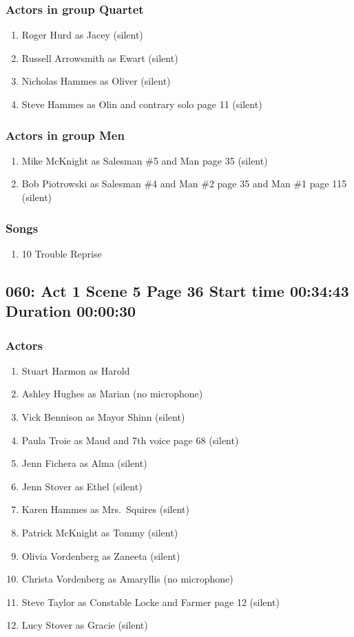 \subsubsection{Actors in group Quartet}
\begin{enumerate}
\item Roger Hurd as Jacey (silent)
\item Russell Arrowsmith as Ewart (silent)
\item Nicholas Hammes as Oliver (silent)
\item Steve Hammes as Olin and contrary solo page 11 (silent)
\end{enumerate}
\subsubsection{Actors in group Men}
\begin{enumerate}
\item Mike McKnight as Salesman \#5 and Man page 35 (silent)
\item Bob Piotrowski as Salesman \#4 and Man \#2 page 35 and Man \#1 page 115 (silent)
\end{enumerate}

\subsubsection{Songs}
\begin{enumerate}
\item 10 Trouble Reprise
\end{enumerate}
\subsection{060: Act 1 Scene 5 Page 36 Start time 00:34:43 Duration 00:00:30}

\subsubsection{Actors}
\begin{enumerate}
\item Stuart Harmon as Harold
\item Ashley Hughes as Marian (no microphone)
\item Vick Bennison as Mayor Shinn (silent)
\item Paula Troie as Maud and 7th voice page 68 (silent)
\item Jenn Fichera as Alma (silent)
\item Jenn Stover as Ethel (silent)
\item Karen Hammes as Mrs.~Squires (silent)
\item Patrick McKnight as Tommy (silent)
\item Olivia Vordenberg as Zaneeta (silent)
\item Christa Vordenberg as Amaryllis (no microphone)
\item Steve Taylor as Constable Locke and Farmer page 12 (silent)
\item Lucy Stover as Gracie (silent)
\end{enumerate}
